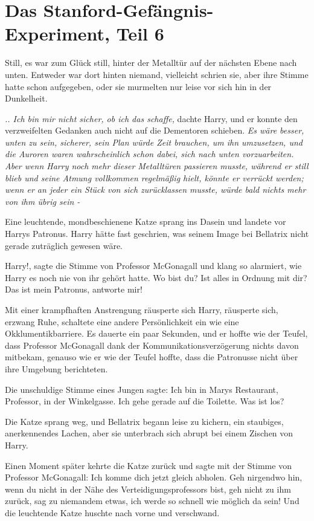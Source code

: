 \chapter{Das Stanford-Gefängnis-Experiment, Teil 6}

Still, es war zum Glück still, hinter der Metalltür auf der nächsten Ebene nach
unten. Entweder war dort hinten niemand, vielleicht schrien sie, aber ihre
Stimme hatte schon aufgegeben, oder sie murmelten nur leise vor sich hin in der
Dunkelheit.

\emph{.. Ich bin mir nicht sicher, ob ich das schaffe,} dachte Harry, und er
konnte den verzweifelten Gedanken auch nicht auf die Dementoren schieben.
\emph{Es wäre besser, unten zu sein, sicherer, sein Plan würde Zeit brauchen, um
ihn umzusetzen, und die Auroren waren wahrscheinlich schon dabei, sich nach
unten vorzuarbeiten. Aber wenn Harry noch mehr dieser Metalltüren passieren
musste, während er still blieb und seine Atmung vollkommen regelmäßig hielt,
könnte er verrückt werden; wenn er an jeder ein Stück von sich zurücklassen
musste, würde bald nichts mehr von ihm übrig sein -}

Eine leuchtende, mondbeschienene Katze sprang ins Dasein und landete vor Harrys
Patronus. Harry hätte fast geschrien, was seinem Image bei Bellatrix nicht
gerade zuträglich gewesen wäre.

\glqq{}Harry!\grqq{}, sagte die Stimme von Professor McGonagall und klang so
alarmiert, wie Harry es noch nie von ihr gehört hatte. \glqq{}Wo bist du? Ist
alles in Ordnung mit dir? Das ist mein Patronus, antworte mir!\grqq{}

Mit einer krampfhaften Anstrengung räusperte sich Harry, räusperte sich, erzwang
Ruhe, schaltete eine andere Persönlichkeit ein wie eine Okklumentikbarriere. Es
dauerte ein paar Sekunden, und er hoffte wie der Teufel, dass Professor
McGonagall dank der Kommunikationsverzögerung nichts davon mitbekam, genauso wie
er wie der Teufel hoffte, dass die Patronusse nicht über ihre Umgebung
berichteten.

Die unschuldige Stimme eines Jungen sagte: \glqq{}Ich bin in Marys Restaurant,
Professor, in der Winkelgasse. Ich gehe gerade auf die Toilette. Was ist los?\grqq{}

Die Katze sprang weg, und Bellatrix begann leise zu kichern, ein staubiges,
anerkennendes Lachen, aber sie unterbrach sich abrupt bei einem Zischen von
Harry.

Einen Moment später kehrte die Katze zurück und sagte mit der Stimme von
Professor McGonagall: \glqq{}Ich komme dich jetzt gleich abholen. Geh nirgendwo
hin, wenn du nicht in der Nähe des Verteidigungsprofessors bist, geh nicht zu
ihm zurück, sag zu niemandem etwas, ich werde so schnell wie möglich da sein!\grqq{}
Und die leuchtende Katze huschte nach vorne und verschwand.

